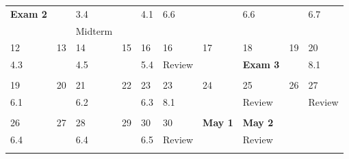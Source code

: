 \begin{center}
\begin{small}
\begin{tabular}{||l|l|l|l|l||l|l|l|l|l||}
\tiny{\bf Exam 2}&          &\tiny{3.4} &          &\tiny{ 4.1}    &  \tiny{6.6}   &          &\tiny{6.6}  &      &\tiny{6.7}  \\ 
        &              & \tiny{Midterm}    &            &       & &              &          &            &       \\
\hline
\tiny{12}  & \tiny{13} &\tiny{14} & \tiny{15} & \tiny{16} & \tiny{16} & \tiny{17}  & \tiny{18} & \tiny{19} & \tiny{20} \\
\tiny{4.3}&            & \tiny{ 4.5}&     &     \tiny{5.4}      & \tiny{Review} &      & \tiny{\bf Exam 3} &       &\tiny{8.1} \\
        &              &          &            &       & &              &          &            &       \\
\hline
\tiny{19} & \tiny{20} & \tiny{21} & \tiny{22} & \tiny{23} & \tiny{23} & \tiny{24} & \tiny{25} & \tiny{26} & \tiny{27} \\
\tiny{6.1}& &\tiny{ 6.2}&          &\tiny{6.3}           & \tiny{8.1}&     & \tiny{Review}     &      & \tiny{Review}    \\
        &       &       &        &       & &       &       &     &\\
\hline
\tiny{26}  & \tiny{27}& \tiny{28} & \tiny{29} & \tiny{30} & \tiny{30} & \tiny{\bf May 1}  & \tiny{\bf May 2} & \tiny{} & \tiny{} \\
\tiny{6.4}&           &\tiny{6.4}&          &\tiny{6.5} &  \tiny{Review}&        &\tiny{Review}&        &      \\
          &          &          &        &        &              &          &             &        &          \\
\hline
\end{tabular}
\end{small}
\end{center}
